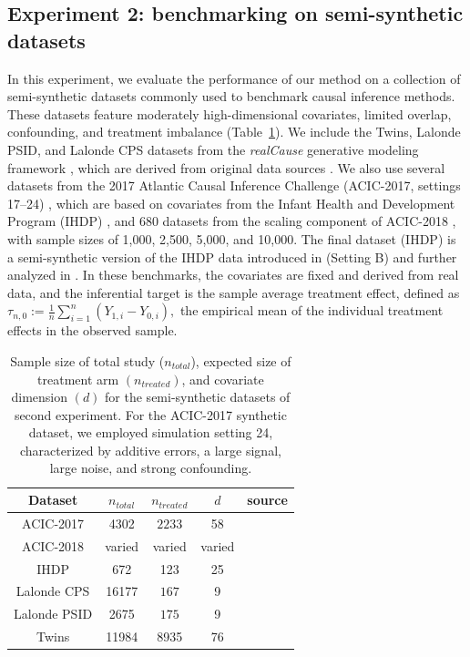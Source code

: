 \documentclass[11pt]{article}
\theoremstyle{plain}
\begin{document}


 

\subsection{Experiment 2: benchmarking on semi-synthetic datasets}

 


In this experiment, we evaluate the performance of our method on a collection of semi-synthetic datasets commonly used to benchmark causal inference methods. These datasets feature moderately high-dimensional covariates, limited overlap, confounding, and treatment imbalance (Table~\ref{tab:dataset_summary}). We include the Twins, Lalonde PSID, and Lalonde CPS datasets from the \textit{realCause} generative modeling framework \citep{neal2020realcause}, which are derived from original data sources \citep{louizos2017causal, lalonde1986evaluating}. We also use several datasets from the 2017 Atlantic Causal Inference Challenge (ACIC-2017, settings 17–24) \citep{hahn2019atlantic}, which are based on covariates from the Infant Health and Development Program (IHDP) \citep{brooks1992effects}, and 680 datasets from the scaling component of ACIC-2018 \citep{shimoni2018benchmarking}, with sample sizes of 1{,}000, 2{,}500, 5{,}000, and 10{,}000. The final dataset (IHDP) is a semi-synthetic version of the IHDP data introduced in \cite{hill2011bayesian} (Setting B) and further analyzed in \cite{shalit2017estimating}. In these benchmarks, the covariates are fixed and derived from real data, and the inferential target is the sample average treatment effect, defined as $ \tau_{n,0}:= \frac{1}{n}\sum_{i=1}^n (Y_{1,i} - Y_{0,i}),$
the empirical mean of the individual treatment effects in the observed sample.

\begin{table}[tb]
\centering
\footnotesize
\caption{Sample size of total study ($n_{total}$), expected size of treatment arm $(n_{treated})$, and covariate dimension $(d)$ for the semi-synthetic datasets of second experiment. For the ACIC-2017 synthetic dataset, we employed simulation setting 24, characterized by additive errors, a large signal, large noise, and strong confounding.}
\label{tab:dataset_summary}
\begin{tabular}{|c|c|c|c|c|}
\hline 
Dataset & $n_{total}$ & $n_{treated}$ & $d$ &  source\\
\hline
\hline
ACIC-2017  & 4302 & $2233$ &  58 & \cite{hahn2019atlantic}\\
\hline
ACIC-2018  & varied & varied &  varied & \cite{shimoni2018benchmarking}\\
\hline
IHDP & 672 & 123 &  25 & \cite{shalit2017estimating}\\
\hline
Lalonde CPS & 16177 & $167$ & 9 & \cite{neal2020realcause} \\
\hline
Lalonde PSID & 2675 & $175$ &  9 & \cite{neal2020realcause}\\
\hline
Twins & 11984 & 8935 &  76 & \cite{neal2020realcause}\\
\hline  
\end{tabular}
\end{table}
\end{document}
